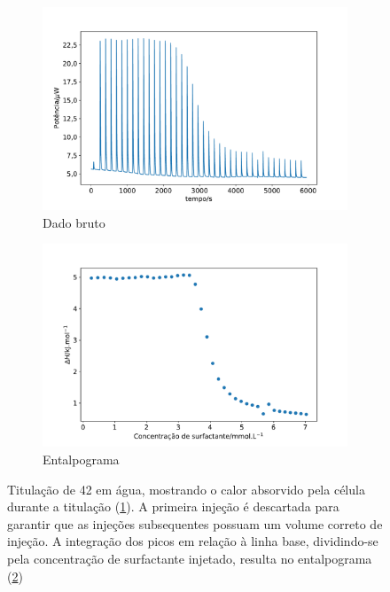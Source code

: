 		\begin{figure}[h]
			\begin{subfigure}[t]{0.5\textwidth}
				\centering
				\includegraphics[width=\textwidth]{./imagens/itc/raw_itc_exemplo}
				\caption{Dado bruto}
				\label{fig:ITC_raw_exemplo}
			\end{subfigure}%
			\begin{subfigure}[t]{0.5\textwidth}
				\centering
				\includegraphics[width=\textwidth]{./imagens/itc/inj_itc_exemplo}
				\caption{Entalpograma}
				\label{fig:ITC_inj_exemplo}
			\end{subfigure}
		
			\caption{Titulação de \TTAB{} 42 \mM{} em água, mostrando o calor absorvido pela célula durante a titulação (\ref{fig:ITC_raw_exemplo}). A primeira injeção é descartada para garantir que as injeções subsequentes possuam um volume correto de injeção. A integração dos picos em relação à linha base, dividindo-se pela concentração de surfactante injetado, resulta no entalpograma (\ref{fig:ITC_inj_exemplo})}
			\label{fig:ITC_exemplo}
		\end{figure}
		
